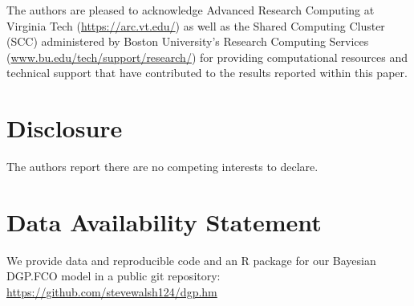 \documentclass[11pt]{article}
\begin{document}
The authors are pleased to acknowledge Advanced Research Computing at Virginia Tech 
(\url{https://arc.vt.edu/}) as well as the Shared Computing Cluster (SCC) administered
by Boston University's Research Computing Services (\url{www.bu.edu/tech/support/research/})
for providing computational resources and technical support that have contributed 
to the results reported within this paper.

\section{Disclosure}
The authors report there are no competing interests to declare.

\section{Data Availability Statement}
We provide data and reproducible code and an {\sf R} package for our 
Bayesian DGP.FCO model in a public git repository: \url{https://github.com/stevewalsh124/dgp.hm}

\appendix
\renewcommand{\thesection}{Appendix \Alph{section}}
\end{document}
